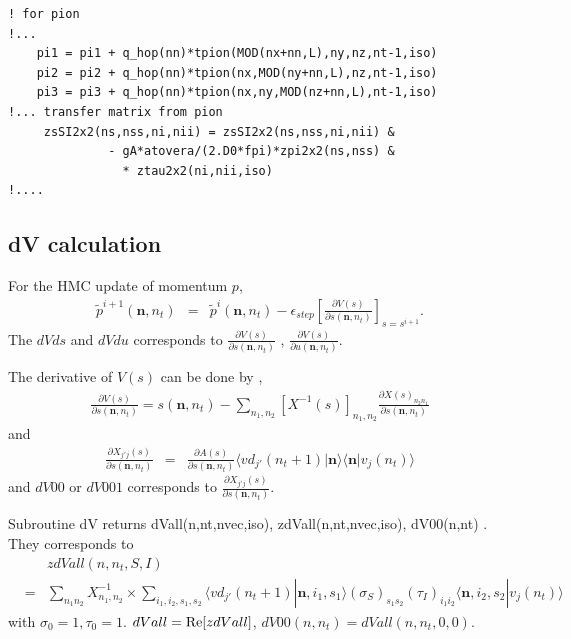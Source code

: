 \documentclass[10pt]{book}
\def\bm{\boldsymbol}
\newcommand{\bea}{\begin{eqnarray}}
\newcommand{\eea}{\end{eqnarray}}
\newcommand{\no}{\nonumber \\}
\newcommand{\del}{\partial}
\def\vn{{\bm n}}
\def\la{\langle}
\def\ra{\rangle}
\begin{document}
\begin{lstlisting}[frame=single]
! for pion
!... 
    pi1 = pi1 + q_hop(nn)*tpion(MOD(nx+nn,L),ny,nz,nt-1,iso)
    pi2 = pi2 + q_hop(nn)*tpion(nx,MOD(ny+nn,L),nz,nt-1,iso)
    pi3 = pi3 + q_hop(nn)*tpion(nx,ny,MOD(nz+nn,L),nt-1,iso)
!... transfer matrix from pion                    
     zsSI2x2(ns,nss,ni,nii) = zsSI2x2(ns,nss,ni,nii) &
              - gA*atovera/(2.D0*fpi)*zpi2x2(ns,nss) &
                * ztau2x2(ni,nii,iso)
!....                                   
\end{lstlisting}


\subsection{dV calculation} 
For the HMC update of momentum $p$,
\bea 
\tilde{p}^{i+1}(\vn,n_t)&=&\tilde{p}^{i}(\vn,n_t)
               -\epsilon_{step}\left[\frac{\del V(s)}{\del s(\vn,n_t)} \right]_{s=s^{i+1}} .
\eea  
The $dVds$ and $dVdu$ corresponds to $\frac{\del V(s)}{\del s(\vn,n_t)}$ , 
$\frac{\del V(s)}{\del u(\vn,n_t)}$.

The derivative of $V(s)$ can be done by ,
\bea 
\frac{\del V(s)}{\del s(\vn,n_t)}
=s(\vn,n_t)-\sum_{n_1,n_2} [X^{-1}(s)]_{n_1,n_2}\frac{\del X(s)_{n_2 n_1}}{\del s(\vn,n_t)}
\eea 
and
\bea 
\frac{\del X_{j' j}(s)}{\del s(\vn,n_t)}
&=&\frac{\del A(s)}{\del s(\vn,n_t)} \la vd_{j'}(n_t+1)|\vn\ra \la \vn |v_{j}(n_t)\ra
\eea 
 and 
$dV00$ or $dV001$ corresponds to $\frac{\del X_{j' j}(s)}{\del s(\vn,n_t)}$.

Subroutine dV returns dVall(n,nt,nvec,iso), zdVall(n,nt,nvec,iso), dV00(n,nt) .
They corresponds to 
\bea 
& &zdVall(n,n_t,S,I) \no 
&=& \sum_{n_1 n_2} X^{-1}_{n_1,n_2}\times  
 \sum_{i_1,i_2,s_1,s_2}
  \la vd_{j'}(n_t+1)|\vn, i_1,s_1\ra (\sigma_S)_{s_1 s_2}(\tau_I)_{i_1  i_2}
  \la \vn, i_2,s_2 |v_{j}(n_t)\ra \nonumber 
\eea 
with $\sigma_0=1,\tau_0=1$. $dVall={\rm Re}[zdVall] $, $dV00(n,n_t)=dVall(n,n_t,0,0)$.
\end{document}

